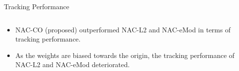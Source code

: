 \documentclass[8pt, aspectratio=169, handout]{beamer}
\begin{document}
\begin{frame}{\insertsubsectionhead}{Tracking Performance}
\begin{columns}
  \end{columns}

  \begin{itemize}
    \item NAC-CO (proposed) outperformed NAC-L2 and NAC-eMod in terms of tracking performance.
    \item As the weights are biased towards the origin, the tracking performance of NAC-L2 and NAC-eMod deteriorated.
  \end{itemize}

\end{frame}








      
\end{document}
